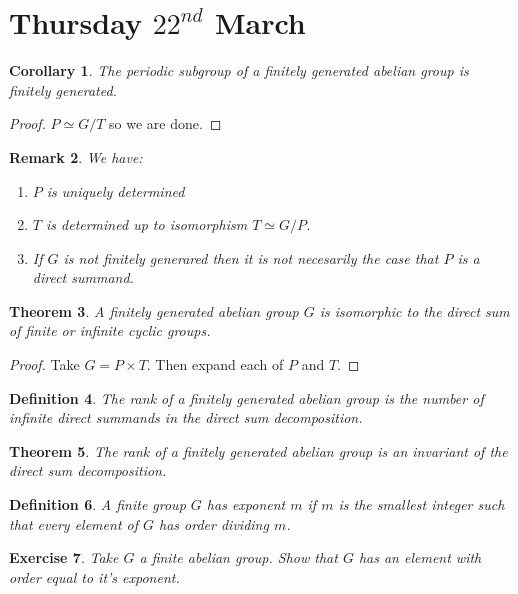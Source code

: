 \documentclass[a4paper,10pt]{article}
\newtheorem{thm}{Theorem}
\newtheorem{Def}[thm]{Definition}
\newtheorem{Cor}[thm]{Corollary}
\newtheorem{Ex}[thm]{Exercise}
\newtheorem{rem}[thm]{Remark}
\begin{document}
\newpage
\section{Thursday $22^{nd}$ March}

\begin{Cor}
The periodic subgroup of a finitely generated abelian group is finitely generated. 
\end{Cor}
\begin{proof}
$P \simeq G / T$ so we are done. 
\end{proof}


\begin{rem}
We have:
\begin{enumerate} 
\item $P$ is uniquely determined
\item $T$ is determined up to isomorphism $ T \simeq G / P$. 
\item If $G$ is not finitely generared then it is not necesarily the case that $P$ is a direct summand.
\end{enumerate}

\end{rem}

\begin{thm}
A finitely generated abelian group $G$ is isomorphic to the direct sum of finite or infinite cyclic groups.
\end{thm}

\begin{proof}
Take $G = P \times T$. Then expand each of $P$ and $T$. 
\end{proof}

\begin{Def}
The rank of a finitely generated abelian group is the number of infinite direct summands in the direct sum decomposition. 
\end{Def}

\begin{thm}
The rank of a finitely generated abelian group is an invariant of the direct sum decomposition.
\end{thm}

\begin{Def}
A finite group $G$ has exponent $m$ if $m$ is the smallest integer such that every element of $G$ has order dividing $m$. 
\end{Def}

\begin{Ex}
Take $G$ a finite abelian group. Show that $G$ has an element with order equal to it's exponent.
\end{Ex}
\end{document}
